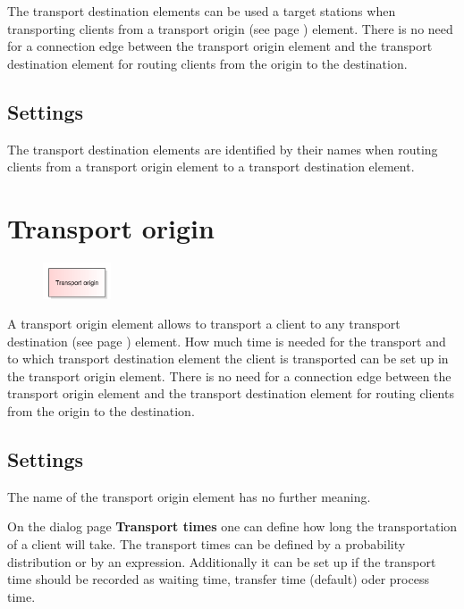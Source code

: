 The transport destination elements can be used a target stations when transporting
clients from a transport origin (see page \pageref{ref:ModelElementTransportSource}) 
element. There is no need for a connection edge between the transport origin element
and the transport destination element for routing clients from the origin to the
destination.

\subsection*{Settings}

The transport destination elements are identified by their names when routing
clients from a transport origin element to a transport destination element.


\section{Transport origin}
\label{ref:ModelElementTransportSource}

\begin{figure}
\vspace{-22pt}
\includegraphics[width=2cm]{imageModelElementTransportSource.png}
\vspace{-22pt}
\end{figure}

A transport origin element allows to transport a client to any
transport destination (see page \pageref{ref:ModelElementTransportDestination}) 
element. How much time is needed for the transport and to which
transport destination element the client is transported can be set up
in the transport origin element. 
There is no need for a connection edge between the transport origin element
and the transport destination element for routing clients from the origin to the
destination.

\subsection*{Settings}

The name of the transport origin element has no further meaning.

On the dialog page \textbf{Transport times} one can define how long the transportation
of a client will take. The transport times can be defined by a probability distribution
or by an expression. Additionally it can be set up if the transport time should be recorded
as waiting time, transfer time (default) oder process time.

